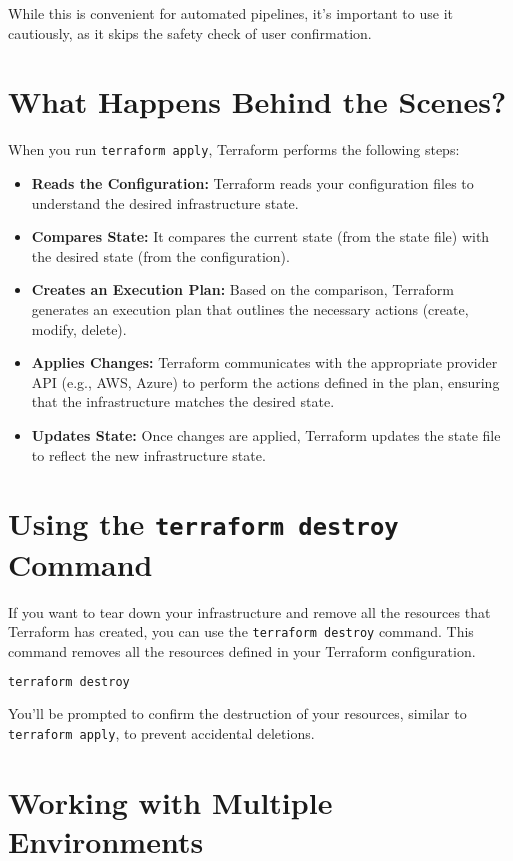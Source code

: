 While this is convenient for automated pipelines, it's important to use it cautiously, as it skips the safety check of user confirmation.

\section{What Happens Behind the Scenes?}

When you run \texttt{terraform apply}, Terraform performs the following steps:

\begin{itemize}
  \item \textbf{Reads the Configuration:} Terraform reads your configuration files to understand the desired infrastructure state.
  \item \textbf{Compares State:} It compares the current state (from the state file) with the desired state (from the configuration).
  \item \textbf{Creates an Execution Plan:} Based on the comparison, Terraform generates an execution plan that outlines the necessary actions (create, modify, delete).
  \item \textbf{Applies Changes:} Terraform communicates with the appropriate provider API (e.g., AWS, Azure) to perform the actions defined in the plan, ensuring that the infrastructure matches the desired state.
  \item \textbf{Updates State:} Once changes are applied, Terraform updates the state file to reflect the new infrastructure state.
\end{itemize}

\section{Using the \texttt{terraform destroy} Command}

If you want to tear down your infrastructure and remove all the resources that Terraform has created, you can use the \texttt{terraform destroy} command. This command removes all the resources defined in your Terraform configuration.

\begin{lstlisting}[language=bash]
terraform destroy
\end{lstlisting}

You'll be prompted to confirm the destruction of your resources, similar to \texttt{terraform apply}, to prevent accidental deletions.

\section{Working with Multiple Environments}

